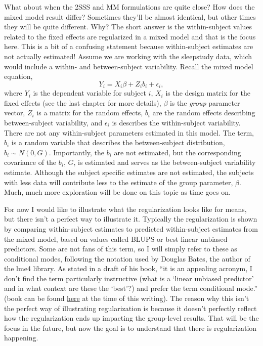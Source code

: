 \documentclass[
]{book}
\begin{document}
What about when the 2SSS and MM formulations are quite close? How does the mixed model result differ? Sometimes they'll be almost identical, but other times they will be quite different. Why? The short answer is the within-subject values related to the fixed effects are regularized in a mixed model and that is the focus here. This is a bit of a confusing statement because within-subject estimates are not actually estimated! Assume we are working with the sleepstudy data, which would include a within- and between-subject variability. Recall the mixed model equation, \[Y_i = X_i\beta + Z_ib_i + \epsilon_i,\] where \(Y_i\) is the dependent variable for subject \(i\), \(X_i\) is the design matrix for the fixed effects (see the last chapter for more details), \(\beta\) is the \emph{group} parameter vector, \(Z_i\) is a matrix for the random effects, \(b_i\) are the random effects describing between-subject variability, and \(\epsilon_i\) is describes the within-subject variability. There are not any within-subject parameters estimated in this model. The term, \(b_i\) is a random variable that describes the between-subject distribution, \(b_i \sim N(0, G)\). Importantly, the \(b_i\) are not estimated, but the corresponding covariance of the \(b_i\), \(G\), is estimated and serves as the between-subject variability estimate. Although the subject specific estimates are not estimated, the subjects with less data will contribute less to the estimate of the group parameter, \(\beta\). Much, much more exploration will be done on this topic as time goes on.

For now I would like to illustrate what the regularization looks like for means, but there isn't a perfect way to illustrate it. Typically the regularization is shown by comparing within-subject estimates to predicted within-subject estimates from the mixed model, based on values called BLUPS or best linear unbiased predictors. Some are not fans of this term, so I will simply refer to these as conditional modes, following the notation used by Douglas Bates, the author of the lme4 library. As stated in a draft of his book, ``it is an appealing acronym, I don't find the term particularly instructive (what is a `linear unbiased predictor' and in what context are these the `best'?) and prefer the term conditional mode.'' (book can be found \href{http://webcom.upmf-grenoble.fr/LIP/Perso/DMuller/M2R/R_et_Mixed/documents/Bates-book.pdf}{here} at the time of this writing). The reason why this isn't the perfect way of illustrating regularization is because it doesn't perfectly reflect how the regularization ends up impacting the group-level results. That will be the focus in the future, but now the goal is to understand that there is regularization happening.
\end{document}
